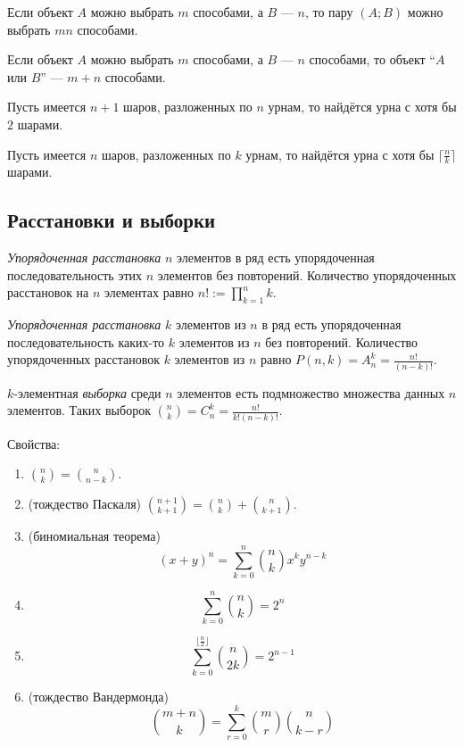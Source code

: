 \documentclass[12pt,a4paper]{article}
\begin{document}
    \begin{statement}
        Если объект $A$ можно выбрать $m$ способами, а $B$ --- $n$, то пару $(A;B)$ можно выбрать $mn$ способами.
    \end{statement}

    \begin{statement}
        Если объект $A$ можно выбрать $m$ способами, а $B$ --- $n$ способами, то объект ``$A$ или $B$'' --- $m+n$ способами.
    \end{statement}

    \begin{statement}
        Пусть имеется $n+1$ шаров, разложенных по $n$ урнам, то найдётся урна с хотя бы $2$ шарами.
    \end{statement}

    \begin{statement}
        Пусть имеется $n$ шаров, разложенных по $k$ урнам, то найдётся урна с хотя бы $\lceil\frac{n}{k}\rceil$ шарами.
    \end{statement}

    \subsection{Расстановки и выборки}

    \begin{definition}
        \emph{Упорядоченная расстановка} $n$ элементов в ряд есть упорядоченная последовательность этих $n$ элементов без повторений. Количество упорядоченных расстановок на $n$ элементах равно $n! := \prod_{k=1}^n k$.
        
        \emph{Упорядоченная расстановка} $k$ элементов из $n$ в ряд есть упорядоченная последовательность каких-то $k$ элементов из $n$ без повторений. Количество упорядоченных расстановок $k$ элементов из $n$ равно $P(n, k) = A_n^k = \frac{n!}{(n-k)!}$.

        $k$-элементная \emph{выборка} среди $n$ элементов есть подмножество множества данных $n$ элементов. Таких выборок $\binom{n}{k}=C_n^k = \frac{n!}{k!(n-k)!}$.
    \end{definition}

    \begin{statement}Свойства:
        \begin{enumerate}
            \item $\binom{n}{k}=\binom{n}{n-k}$.
            \item (тождество Паскаля) $\binom{n+1}{k+1} = \binom{n}{k} + \binom{n}{k+1}$.
            \item (биномиальная теорема) \[(x+y)^n=\sum_{k=0}^n \binom{n}{k} x^k y^{n-k}\]
            \item \[\sum_{k=0}^n \binom{n}{k} = 2^n\]
            \item \[\sum_{k=0}^{\lfloor\frac{n}{2}\rfloor} \binom{n}{2k} = 2^{n-1}\]
            \item (тождество Вандермонда) \[\binom{m+n}{k} = \sum_{r=0}^k \binom{m}{r}\binom{n}{k-r}\]
        \end{enumerate}
    \end{statement}
\end{document}
